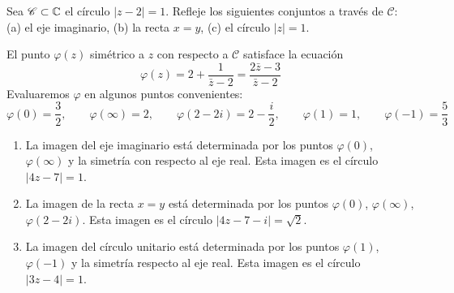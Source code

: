 \begin{exercise}
Sea $\mathscr C \subset \mathbb C$ el círculo $|z-2| = 1$. Refleje los siguientes conjuntos a través de $\mathscr C$: (a) el eje imaginario, (b) la recta $x = y$, (c) el círculo $|z| = 1$.
\end{exercise}

\begin{solution}
El punto $\varphi(z)$ simétrico a $z$ con respecto a $\mathscr C$ satisface la ecuación
$$\varphi(z) = 2 + \frac 1 {\bar z - 2} = \frac {2\bar z - 3} {\bar z - 2}$$
Evaluaremos $\varphi$ en algunos puntos convenientes:
$$
\varphi(0) = \frac 32, \qquad \varphi(\infty) = 2, \qquad
\varphi(2 - 2i) = 2 - \frac i2, \qquad \varphi(1) = 1, \qquad \varphi(-1) = \frac 53
$$

\begin{enumerate}[label=(\alph*)]
    \item La imagen del eje imaginario está determinada por los puntos $\varphi(0)$, $\varphi(\infty)$ y la simetría con respecto al eje real. Esta imagen es el círculo $|4z - 7| = 1$.
    
    \item La imagen de la recta $x = y$ está determinada por los puntos $\varphi(0)$, $\varphi(\infty)$, $\varphi(2-2i)$. Esta imagen es el círculo $|4z - 7 - i| = \sqrt 2$.
    
    \item La imagen del círculo unitario está determinada por los puntos $\varphi(1)$, $\varphi(-1)$ y la simetría respecto al eje real. Esta imagen es el círculo $|3z - 4| = 1$.
\end{enumerate}
\end{solution}
